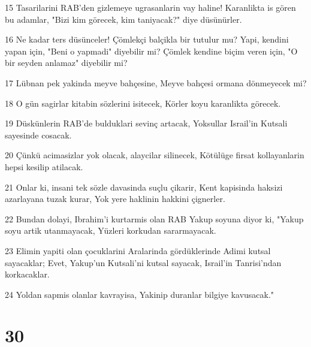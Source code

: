 \par 15 Tasarilarini RAB'den gizlemeye ugrasanlarin vay haline! Karanlikta is gören bu adamlar, "Bizi kim görecek, kim taniyacak?" diye düsünürler.
\par 16 Ne kadar ters düsünceler! Çömlekçi balçikla bir tutulur mu? Yapi, kendini yapan için, "Beni o yapmadi" diyebilir mi? Çömlek kendine biçim veren için, "O bir seyden anlamaz" diyebilir mi?
\par 17 Lübnan pek yakinda meyve bahçesine, Meyve bahçesi ormana dönmeyecek mi?
\par 18 O gün sagirlar kitabin sözlerini isitecek, Körler koyu karanlikta görecek.
\par 19 Düskünlerin RAB'de bulduklari sevinç artacak, Yoksullar Israil'in Kutsali sayesinde cosacak.
\par 20 Çünkü acimasizlar yok olacak, alaycilar silinecek, Kötülüge firsat kollayanlarin hepsi kesilip atilacak.
\par 21 Onlar ki, insani tek sözle davasinda suçlu çikarir, Kent kapisinda haksizi azarlayana tuzak kurar, Yok yere haklinin hakkini çignerler.
\par 22 Bundan dolayi, Ibrahim'i kurtarmis olan RAB Yakup soyuna diyor ki, "Yakup soyu artik utanmayacak, Yüzleri korkudan sararmayacak.
\par 23 Elimin yapiti olan çocuklarini Aralarinda gördüklerinde Adimi kutsal sayacaklar; Evet, Yakup'un Kutsali'ni kutsal sayacak, Israil'in Tanrisi'ndan korkacaklar.
\par 24 Yoldan sapmis olanlar kavrayisa, Yakinip duranlar bilgiye kavusacak."

\chapter{30}

